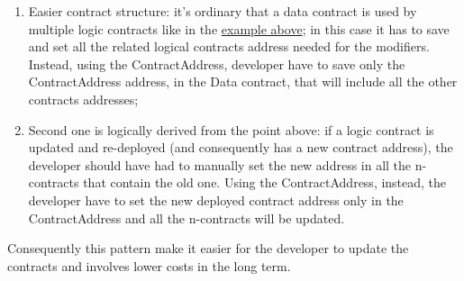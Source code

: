\begin{enumerate}
	\item Easier contract structure: it's ordinary that a data contract is used by multiple logic contracts like in the \hyperref[DataLogic]{example above}; in this case it has to save and set all the related logical contracts address needed for the modifiers. Instead, using the ContractAddress, developer have to save only the ContractAddress address, in the Data contract, that will include all the other contracts addresses;
	\item Second one is logically derived from the point above: if a logic contract is updated and re-deployed (and consequently has a new contract address), the developer should have had to manually set the new address in all the n-contracts that contain the old one. Using the ContractAddress, instead, the developer have to set the new deployed contract address only in the ContractAddress and all the n-contracts will be updated.
\end{enumerate}
Consequently this pattern make it easier for the developer to update the contracts and involves lower costs in the long term.
\newpage
